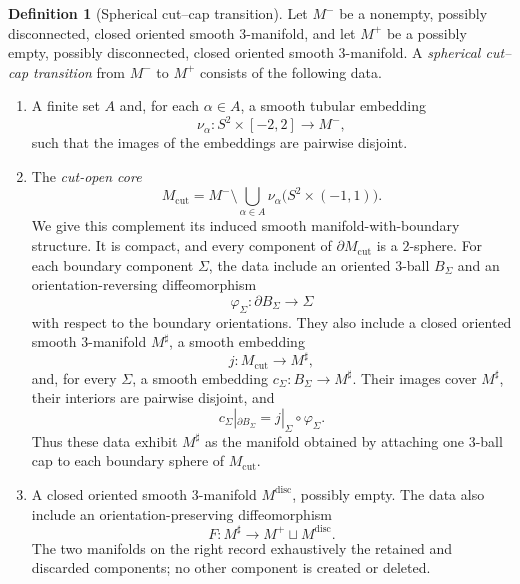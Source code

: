 \documentclass[10pt]{coll-l}
\theoremstyle{definition}
\newtheorem{definition}[theorem]{Definition}
\theoremstyle{remark}
\numberwithin{section}{chapter}
\numberwithin{equation}{chapter}
\begin{document}
\begin{definition}[Spherical cut--cap transition]
\label{def:cut-cap-transition}
Let $M^{-}$ be a nonempty, possibly disconnected, closed oriented smooth
$3$-manifold, and let $M^{+}$ be a possibly empty, possibly disconnected,
closed oriented smooth $3$-manifold.  A \emph{spherical cut--cap transition}
from $M^{-}$ to $M^{+}$ consists of the following data.

\begin{enumerate}
\item A finite set $A$ and, for each $\alpha\in A$, a smooth tubular
embedding
\[
  \nu_{\alpha}\colon S^{2}\times[-2,2]\longrightarrow M^{-},
\]
such that the images of the embeddings are pairwise disjoint.

\item The \emph{cut-open core}
\[
  M_{\mathrm{cut}}
  =
  M^{-}\setminus
  \bigcup_{\alpha\in A}
  \nu_{\alpha}\bigl(S^{2}\times(-1,1)\bigr).
\]
We give this complement its induced smooth manifold-with-boundary structure.
It is compact, and every component of $\partial M_{\mathrm{cut}}$ is a
$2$-sphere.  For each boundary component $\Sigma$, the data include an
oriented $3$-ball $B_{\Sigma}$ and an orientation-reversing diffeomorphism
\[
  \varphi_{\Sigma}\colon\partial B_{\Sigma}\longrightarrow\Sigma
\]
with respect to the boundary orientations.  They also include a closed
oriented smooth $3$-manifold $M^{\sharp}$, a smooth embedding
\[
  j\colon M_{\mathrm{cut}}\longrightarrow M^{\sharp},
\]
and, for every $\Sigma$, a smooth embedding
$c_{\Sigma}\colon B_{\Sigma}\to M^{\sharp}$.  Their images cover
$M^{\sharp}$, their interiors are pairwise disjoint, and
\[
  c_{\Sigma}|_{\partial B_{\Sigma}}
  =
  j|_{\Sigma}\circ\varphi_{\Sigma}.
\]
Thus these data exhibit $M^{\sharp}$ as the manifold obtained by attaching
one $3$-ball cap to each boundary sphere of $M_{\mathrm{cut}}$.

\item A closed oriented smooth $3$-manifold $M^{\mathrm{disc}}$, possibly
empty.  The data also include an orientation-preserving diffeomorphism
\[
  F\colon M^{\sharp}\longrightarrow
  M^{+}\sqcup M^{\mathrm{disc}}.
\]
The two manifolds on the right record exhaustively the retained and discarded
components; no other component is created or deleted.
\end{enumerate}


\end{definition}
\end{document}
